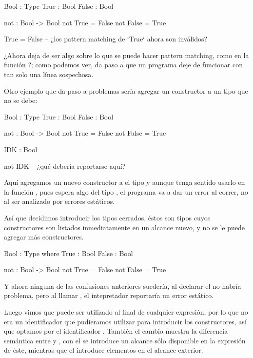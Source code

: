 {\begin{designfr}
\begin{anglercode}
Bool : Type
True : Bool
False : Bool

not : Bool -> Bool
not True = False
not False = True

True = False    -- ¿los pattern matching de `True` ahora son inválidos?
\end{anglercode}

¿Ahora  deja de ser algo sobre lo que se puede hacer pattern matching, como en la función ?; como podemos ver, da paso a que un programa deje de funcionar con tan solo una línea sospechosa.

Otro ejemplo que da paso a problemas sería agregar un constructor a un tipo que no se debe:

\begin{anglercode}
Bool : Type
True : Bool
False : Bool

not : Bool -> Bool
not True = False
not False = True

IDK : Bool

not IDK         -- ¿qué debería reportarse aquí?
\end{anglercode}

Aquí agregamos un nuevo constructor a el tipo  y aunque tenga sentido usarlo en la función , pues espera algo del tipo , el programa va a dar un error al correr, no al ser analizado por errores estáticos.

Así que decidimos introducir los tipos cerrados, éstos son tipos cuyos constructores son listados inmediatamente en un alcance nuevo, y no se le puede agregar más constructores.

\begin{anglercode}
Bool : Type where
    True : Bool
    False : Bool

not : Bool -> Bool
not True = False
not False = True
\end{anglercode}

Y ahora ninguna de las confusiones anteriores suedería, al declarar el  no habría problema, pero al llamar , el intepretador reportaría un error estático.

Luego vimos que  puede ser utilizado al final de cualquier expresión, por lo que no era un identificador que pudieramos utilizar para introducir los constructores, así que optamos por el identificador . También el cambio muestra la diferencia semántica entre  y , con el  se introduce un alcance sólo disponible en la expresión de éste, mientras que el  introduce elementos en el alcance exterior.


\end{designfr}}
